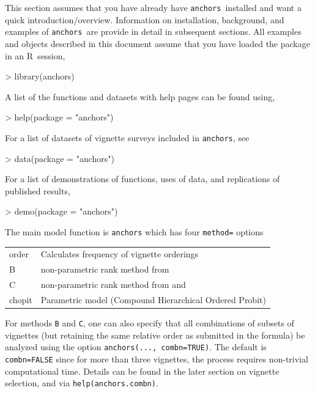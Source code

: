 \documentclass{amsart}
\newcommand{\code}[1]{{\texttt{#1}}}
\newcommand{\R}{{\normalfont\textsf{R}}{}}
\newcommand{\Ranchors}{{\texttt{anchors}}}
\begin{document}
This section assumes that you have already have \Ranchors\ installed
and want a quick introduction/overview.  Information on installation,
background, and examples of \Ranchors\ are provide in detail in
subsequent sections.  All examples and objects described in this
document assume that you have loaded the package in an \R\ session,
\begin{Schunk}
\begin{Sinput}
> library(anchors)
\end{Sinput}
\end{Schunk}

A list of the functions and datasets with help pages can be found using,
\begin{Schunk}
\begin{Sinput}
> help(package = "anchors")
\end{Sinput}
\end{Schunk}
For a list of datasets of vignette surveys included in \Ranchors, see
\begin{Schunk}
\begin{Sinput}
> data(package = "anchors")
\end{Sinput}
\end{Schunk}
For a list of demonstrations of functions, uses of data, and
replications of published results,
\begin{Schunk}
\begin{Sinput}
> demo(package = "anchors")
\end{Sinput}
\end{Schunk}
The main model function is \code{anchors} which has four \code{method=} options
  
\begin{tabular}{ll}
  order       & Calculates frequency of vignette orderings\\
  B   & non-parametric rank method from \cite{wand:2007a}\\
  C   & non-parametric rank method from \cite{king:2004} and \cite{king.wand:2007}\\
  chopit      & Parametric model (Compound Hierarchical Ordered Probit) \\
\end{tabular}

\noindent
For methods \code{B} and \code{C}, one can also specify that all
combinations of subsets of vignettes (but retaining the same relative
order as submitted in the formula) be analyzed using the option
\code{anchors(..., combn=TRUE)}.  The default is \code{combn=FALSE}
since for more than three vignettes, the process requires non-trivial
computational time.  Details can be found in the later section on
vignette selection, and via \code{help(anchors.combn)}.
\end{document}
